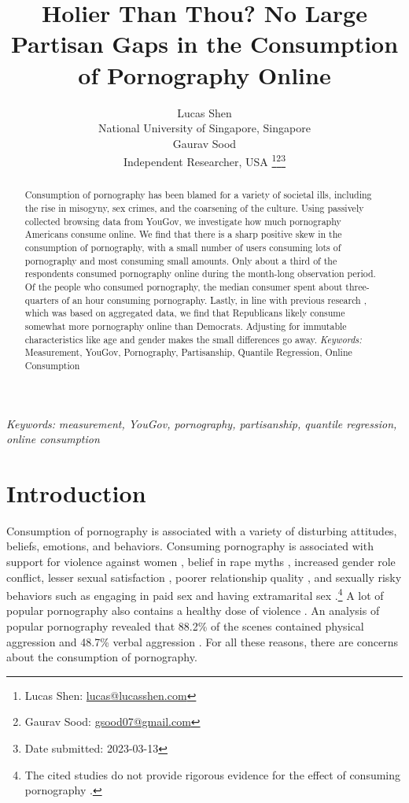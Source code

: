 \documentclass[12pt,twoside]{article}
\date{}
\title{\normalsize \headingfont \textbf{Holier Than Thou? No Large Partisan Gaps in the Consumption of Pornography Online} \vspace{-1.5em}}
\author{\normalsize Lucas Shen\\ \normalsize National University of Singapore, Singapore
\vspace{1em} \\ \normalsize Gaurav Sood \\ \normalsize Independent Researcher, USA \thanks{Lucas Shen: \href{mailto:lucas@lucasshen.com}{lucas@lucasshen.com}}\thanks{Gaurav Sood: \href{mailto:gsood07@gmail.com}{gsood07@gmail.com}}\thanks{Date submitted: 2023-03-13}}
\providecommand{\keywords}[1]
{
   \small	
  \textit{\hspace{-1em} Keywords: } #1
}
\begin{document}
\maketitle
\thispagestyle{firstpage}
\vspace{-8em}

\begin{abstract}
  Consumption of pornography has been blamed for a variety of societal ills, including the rise in misogyny, sex crimes, and the coarsening of the culture. Using passively collected browsing data from YouGov, we investigate how much pornography Americans consume online. We find that there is a sharp positive skew in the consumption of pornography, with a small number of users consuming lots of pornography and most consuming small amounts. Only about a third of the respondents consumed pornography online during the month-long observation period. Of the people who consumed pornography, the median consumer spent about three-quarters of an hour consuming pornography. Lastly, in line with previous research \citep{macinnis2015american, edelman2009markets}, which was based on aggregated data, we find that Republicans likely consume somewhat more pornography online than Democrats. Adjusting for immutable characteristics like age and gender makes the small differences go away.
\emph{Keywords:} Measurement, YouGov, Pornography, Partisanship, Quantile Regression, Online Consumption
\end{abstract}

\keywords{\textit{measurement, YouGov, pornography, partisanship, quantile regression, online consumption} \vspace{8ex}}

\section{Introduction}\label{sec:intro}
Consumption of pornography is associated with a variety of disturbing attitudes, beliefs, emotions, and behaviors. Consuming pornography is associated with support for violence against women \citep{hald2010pornography, malamuth2012pornography, donnerstein1984pornography}, belief in rape myths \citep{foubert2011pornography}, increased gender role conflict, lesser sexual satisfaction \citep{szymanski2014psychological, stewart2012young}, poorer relationship quality \citep{szymanski2014psychological, szymanski2015male}, and sexually risky behaviors such as engaging in paid sex and having extramarital sex \citep{wright2012internet}.\footnote{The cited studies do not provide rigorous evidence for the effect of consuming pornography \citep{Ferguson2022-fo, Pathmendra2023-fx, Peter2016-de}.} A lot of popular pornography also contains a healthy dose of violence \citep{Vera-Gray2021-qv}. An analysis of popular pornography revealed that 88.2\% of the scenes contained physical aggression and 48.7\% verbal aggression \citep{bridges2010aggression}. For all these reasons, there are concerns about the consumption of pornography.
\end{document}

